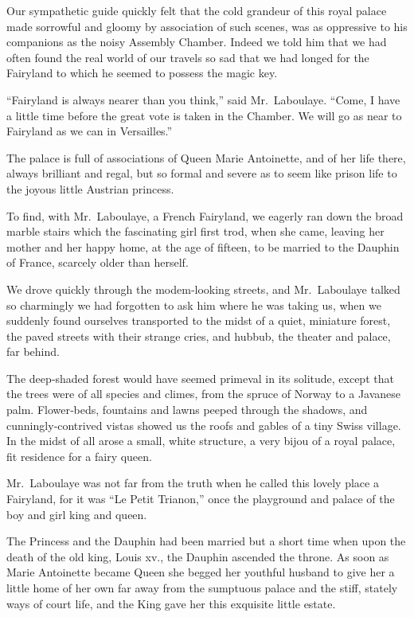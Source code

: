\documentclass[12pt]{book}
\begin{document}
Our sympathetic guide quickly felt that the cold grandeur of this royal palace
made sorrowful and gloomy by association of such scenes, was as oppressive to
his companions as the noisy Assembly Chamber. Indeed we told him that we
had often found the real world of our travels so sad that we had longed for the
Fairyland to which he seemed to possess the magic key.

“Fairyland is always nearer than you think,” said Mr.~Laboulaye. “Come, I
have a little time before the great vote is taken in the Chamber. We will go as
near to Fairyland as we can in Versailles.”

The palace is full of associations of Queen Marie Antoinette, and of her life
there, always brilliant and regal, but so formal and severe as to seem like prison
life to the joyous little Austrian princess.

To find, with Mr.~Laboulaye, a French Fairyland, we eagerly ran down the
broad marble stairs which the fascinating girl first trod, when she came, leaving
her mother and her happy home, at the age of fifteen, to be married to the Dauphin
of France, scarcely older than herself.

We drove quickly through the modem‐looking streets, and Mr.~Laboulaye
talked so charmingly we had forgotten to ask him where he was taking us, when
we suddenly found ourselves transported to the midst of a quiet, miniature forest,
the paved streets with their strange cries, and hubbub, the theater and palace, far
behind.

The deep‐shaded forest would have seemed primeval in its solitude, except
that the trees were of all species and climes, from the spruce of Norway to a
Javanese palm. Flower‐beds, fountains and lawns peeped through the shadows,
and cunningly‐contrived vistas showed us the roofs and gables of a tiny Swiss
village. In the midst of all arose a small, white structure, a very bijou of a royal
palace, fit residence for a fairy queen.

Mr.~Laboulaye was not far from the truth when he called this lovely place a
Fairyland, for it was “Le Petit Trianon,” once the playground and palace of the
boy and girl king and queen.

The Princess and the Dauphin had been married but a short time when upon
the death of the old king, Louis xv., the Dauphin ascended the throne. As soon as
Marie Antoinette became Queen she begged her youthful husband to give her a
little home of her own far away from the sumptuous palace and the stiff, stately
ways of court life, and the King gave her this exquisite little estate.
\end{document}
